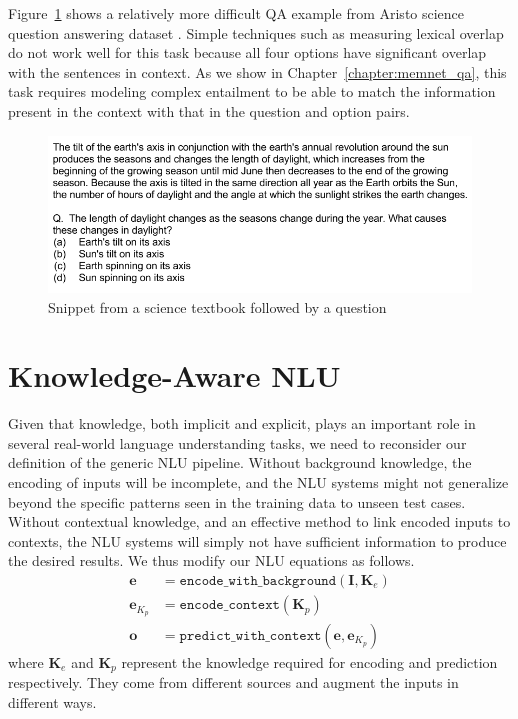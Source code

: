 Figure~\ref{fig:science_qa_example} shows a relatively more difficult QA example from Aristo science question answering dataset \citep{clark2015elementary}. Simple techniques such as measuring lexical overlap do not
work well for this task because all four options have significant overlap with the sentences in context. As we show in Chapter~\ref{chapter:memnet_qa}, this task requires modeling complex entailment to be able to match the information present in the context with that in the question and
option pairs.
\begin{figure}
\begin{center}
\includegraphics[width=6in]{figures/science_qa_example.png}
\caption{Snippet from a science textbook followed by a question}
\label{fig:science_qa_example}
\end{center}
\end{figure}


\section{Knowledge-Aware NLU}
Given that knowledge, both implicit and explicit, plays an important role in several real-world language understanding tasks, we need to reconsider
our definition of the generic NLU pipeline.
Without background knowledge, the encoding of inputs will be incomplete, and the NLU systems might not generalize beyond the specific patterns 
seen in the training data to unseen test cases. Without contextual knowledge, and an effective method to link encoded inputs to contexts, the NLU
systems will simply not have sufficient information to produce the desired results. We thus modify our NLU equations as follows.
\begin{align}
 \mathbf{e} &= \mathtt{encode\_with\_background}(\mathbf{I}, \mathbf{K}_e) \label{eq:encoding_with_knowledge}\\
 \mathbf{e}_{K_p} &= \mathtt{encode\_context}(\mathbf{K}_p) \\ \label{eq:knowledge_encoding}
 \mathbf{o} &= \mathtt{predict\_with\_context}(\mathbf{e}, \mathbf{e}_{K_p}) \label{eq:prediction_with_knowledge}
\end{align}
where $\mathbf{K}_e$ and $\mathbf{K}_p$ represent the knowledge required for encoding and prediction respectively. They
come from different sources and augment the inputs in different ways.

